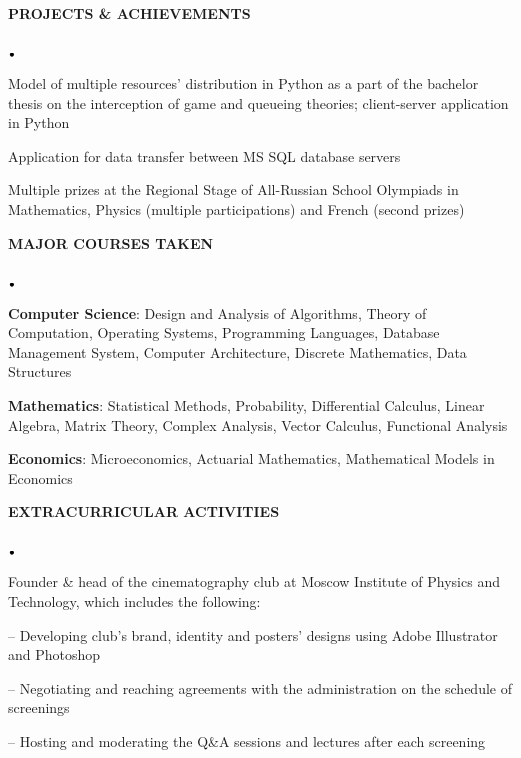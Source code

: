 \documentclass[11pt]{article}
\newcommand{\lineunder}{\vspace*{-8pt} \\ \hspace*{-18pt} \hrulefill \\}
\newcommand{\header}[1]{{\hspace*{-15pt}\vspace*{6pt} \textsc{#1}} \vspace*{-6pt} \lineunder}
\newcommand{\lbt}{\,\begin{picture}(-1,1)(-1,-3)\circle*{3}\end{picture}\ }
\newenvironment{achievements}{
    \begin{list}{$\lbt$}{
        \topsep 0pt
        \itemsep 0pt
        \addtolength{\leftmargin}{-0.1in}
    }
}
{
    \vspace*{4pt}
    \end{list}
}
\begin{document}
\header{\textbf{PROJECTS \& ACHIEVEMENTS}}
\vspace{2mm}
    \begin{achievements}
    \item{Model of multiple resources' distribution in Python as a part of the bachelor thesis on the interception of game and queueing theories; client-server application in Python}
    \item{Application for data transfer between MS SQL database servers}
    \item{Multiple prizes at the Regional Stage of All-Russian School Olympiads in Mathematics, Physics (multiple participations) and French (second prizes)}
    
    
    \end{achievements}
\hfill{}


\header{\textbf{MAJOR COURSES TAKEN}}
\vspace{2mm}

   
     \begin{achievements}

    \item{\textbf{Computer Science}: Design and Analysis of Algorithms, Theory of Computation, Operating Systems, Programming Languages, Database Management System, Computer Architecture, Discrete Mathematics, Data Structures}
     \item{\textbf{Mathematics}: Statistical Methods, Probability, Differential Calculus, Linear Algebra, Matrix Theory, Complex Analysis, Vector Calculus, Functional Analysis}
     \item{\textbf{Economics}: Microeconomics, Actuarial Mathematics, Mathematical Models in Economics}
    \end{achievements}
    \hfill{}
   
\header{\textbf{EXTRACURRICULAR ACTIVITIES}}
\vspace{2mm}
\begin{achievements}
\item{Founder \& head of the cinematography club at Moscow Institute of Physics and Technology, which includes the following:}

-- {Developing club's brand, identity and posters' designs using Adobe Illustrator and Photoshop}


-- {Negotiating and reaching agreements with the administration on the schedule of screenings}


-- {Hosting and moderating the Q\&A sessions and lectures after each screening}
\end{achievements}
\end{document}
